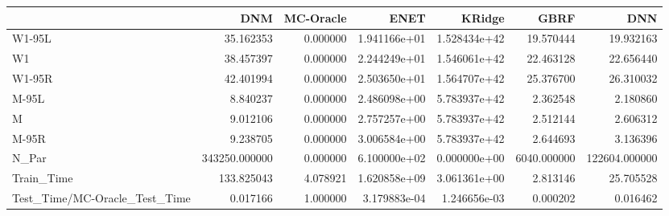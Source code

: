 \begin{tabular}{lrrrrrr}
\toprule
{} &            DNM &  MC-Oracle &          ENET &        KRidge &         GBRF &            DNN \\
\midrule
W1-95L                        &      35.162353 &   0.000000 &  1.941166e+01 &  1.528434e+42 &    19.570444 &      19.932163 \\
W1                            &      38.457397 &   0.000000 &  2.244249e+01 &  1.546061e+42 &    22.463128 &      22.656440 \\
W1-95R                        &      42.401994 &   0.000000 &  2.503650e+01 &  1.564707e+42 &    25.376700 &      26.310032 \\
M-95L                         &       8.840237 &   0.000000 &  2.486098e+00 &  5.783937e+42 &     2.362548 &       2.180860 \\
M                             &       9.012106 &   0.000000 &  2.757257e+00 &  5.783937e+42 &     2.512144 &       2.606312 \\
M-95R                         &       9.238705 &   0.000000 &  3.006584e+00 &  5.783937e+42 &     2.644693 &       3.136396 \\
N\_Par                         &  343250.000000 &   0.000000 &  6.100000e+02 &  0.000000e+00 &  6040.000000 &  122604.000000 \\
Train\_Time                    &     133.825043 &   4.078921 &  1.620858e+09 &  3.061361e+00 &     2.813146 &      25.705528 \\
Test\_Time/MC-Oracle\_Test\_Time &       0.017166 &   1.000000 &  3.179883e-04 &  1.246656e-03 &     0.000202 &       0.016462 \\
\bottomrule
\end{tabular}
